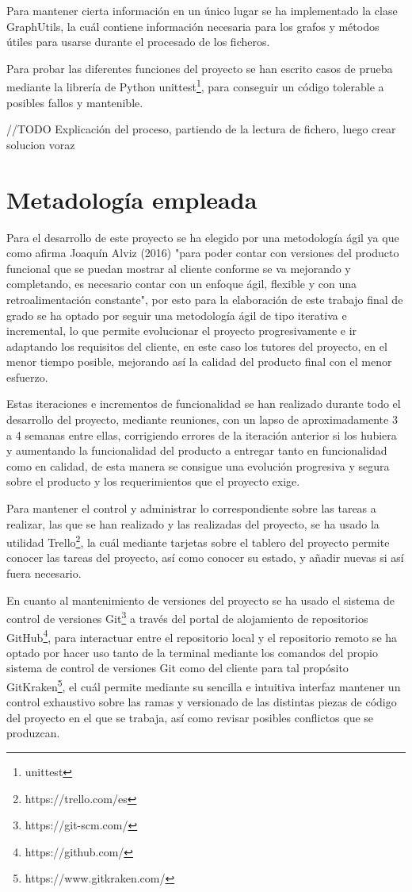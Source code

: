 Para mantener cierta información en un único lugar se ha implementado la clase GraphUtils, la cuál contiene información necesaria para los grafos y métodos útiles para usarse durante el procesado de los ficheros.

Para probar las diferentes funciones del proyecto se han escrito casos de prueba mediante la librería de Python unittest\footnote{unittest}, para conseguir un código tolerable a posibles fallos y mantenible.

//TODO Explicación del proceso, partiendo de la lectura de fichero, luego crear solucion voraz


\section{Metadología empleada}
Para el desarrollo de este proyecto se ha elegido por una metodología ágil ya que como afirma Joaquín Alviz (2016) \cite{Reference1} "para poder contar con versiones del producto funcional que se puedan mostrar al cliente conforme se va mejorando y completando, es necesario contar con un enfoque ágil, flexible y con una retroalimentación constante", por esto para la elaboración de este trabajo final de grado se ha optado por seguir una metodología ágil de tipo iterativa e incremental, lo que permite evolucionar el proyecto progresivamente e ir adaptando los requisitos del cliente, en este caso los tutores del proyecto, en el menor tiempo posible, mejorando así la calidad del producto final con el menor esfuerzo.

Estas iteraciones e incrementos de funcionalidad se han realizado durante todo el desarrollo del proyecto, mediante reuniones, con un lapso de aproximadamente 3 a 4 semanas entre ellas, corrigiendo errores de la iteración anterior si los hubiera y aumentando la funcionalidad del producto a entregar tanto en funcionalidad como en calidad, de esta manera se consigue una evolución progresiva y segura sobre el producto y los requerimientos que el proyecto exige.

Para mantener el control y administrar lo correspondiente sobre las tareas a realizar, las que se han realizado y las realizadas del proyecto, se ha usado la utilidad Trello\footnote{https://trello.com/es}, la cuál mediante tarjetas sobre el tablero del proyecto permite conocer las tareas del proyecto, así como conocer su estado, y añadir nuevas si así fuera necesario.

En cuanto al mantenimiento de versiones del proyecto se ha usado el sistema de control de versiones Git\footnote{https://git-scm.com/} a través del portal de alojamiento de repositorios GitHub\footnote{https://github.com/}, para interactuar entre el repositorio local y el repositorio remoto se ha optado por hacer uso tanto de la terminal mediante los comandos del propio sistema de control de versiones Git como del cliente para tal propósito GitKraken\footnote{https://www.gitkraken.com/}, el cuál permite mediante su sencilla e intuitiva interfaz mantener un control exhaustivo sobre las ramas y versionado de las distintas piezas de código del proyecto en el que se trabaja, así como revisar posibles conflictos que se produzcan.

